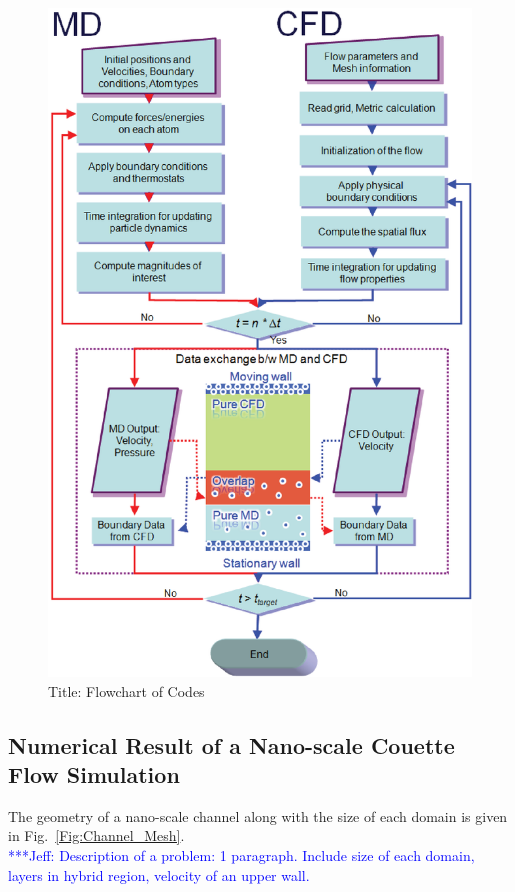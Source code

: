 \documentclass[conference,final]{IEEEtran}
\newcommand{\skonote}[1]{ {\textcolor{blue} { ***Jeff: #1 }}}
\newcommand{\skonote}[1]{}
\begin{document}
\begin{figure}
\centering
\includegraphics[scale=0.3]{Code_Flowchart.eps}
\caption{\small Title: Flowchart of Codes}
\label{Fig:Code_Flowchart}
\vspace{-1em}
\end{figure}


\subsection{Numerical Result of a Nano-scale Couette Flow Simulation}


The geometry of a nano-scale channel along with the size of each domain is given in Fig.~\ref{Fig:Channel_Mesh}.\\
\skonote{Description of a problem: 1 paragraph. Include size of each domain, layers in hybrid region, velocity of an upper wall.}
\newline
\newline
\end{document}
